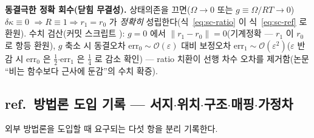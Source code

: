 \begin{derivbox}
\textbf{동결극한 정확 회수(닫힘 무결성).} 상태의존을 끄면($\Omega\to0$ 또는 $g\equiv\Omega/RT\to0$) $\delta\kappa\equiv0$
$\Rightarrow R\equiv1\Rightarrow r_1=r_0$ 가 \emph{정확히} 성립한다(식~\eqref{eq:sc-ratio} 이 식~\eqref{eq:sc-ref} 로 환원).
수치 검산(커밋 스크립트 ): $g=0$ 에서 $\lVert r_1-r_0\rVert=0$(기계정확 ---
$r_1$ 이 $r_0$ 로 항등 환원), $g$ 축소 시 동결오차 $\mathrm{err}_0\sim\mathcal O(\varepsilon)$ 대비 보정오차
$\mathrm{err}_1\sim\mathcal O(\varepsilon^2)$($\varepsilon$ 반감 시 $\mathrm{err}_0$ 은 $\tfrac12$$\cdot$$\mathrm{err}_1$ 은
$\tfrac14$ 로 감소 확인) --- ratio 치환이 선행 차수 오차를 제거함(논문 ``비는 함수보다 근사에 둔감''의 수치 확증).
\end{derivbox}

\subsection{ref.\ 방법론 도입 기록 --- 서지$\cdot$위치$\cdot$구조$\cdot$매핑$\cdot$가정차}\label{sec:sc-p35}
외부 방법론을 도입할 때 요구되는 다섯 항을 분리 기록한다.
